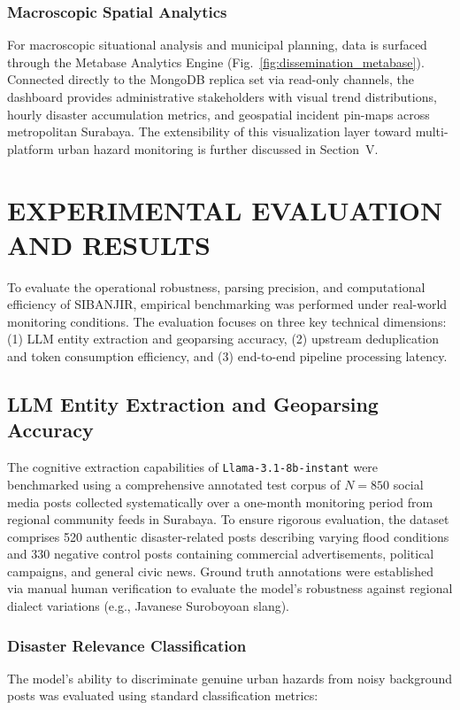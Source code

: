 \documentclass[conference]{IEEEtran}
\begin{document}
\subsubsection{Macroscopic Spatial Analytics}
For macroscopic situational analysis and municipal planning, data is surfaced through the Metabase Analytics Engine (Fig.~\ref{fig:dissemination_metabase}). Connected directly to the MongoDB replica set via read-only channels, the dashboard provides administrative stakeholders with visual trend distributions, hourly disaster accumulation metrics, and geospatial incident pin-maps across metropolitan Surabaya. The extensibility of this visualization layer toward multi-platform urban hazard monitoring is further discussed in Section~V.

\section{EXPERIMENTAL EVALUATION AND RESULTS}

To evaluate the operational robustness, parsing precision, and computational efficiency of SIBANJIR, empirical benchmarking was performed under real-world monitoring conditions. The evaluation focuses on three key technical dimensions: (1) LLM entity extraction and geoparsing accuracy, (2) upstream deduplication and token consumption efficiency, and (3) end-to-end pipeline processing latency.

\subsection{LLM Entity Extraction and Geoparsing Accuracy}
The cognitive extraction capabilities of \texttt{Llama-3.1-8b-instant} were benchmarked using a comprehensive annotated test corpus of $N = 850$ social media posts collected systematically over a one-month monitoring period from regional community feeds in Surabaya. To ensure rigorous evaluation, the dataset comprises 520 authentic disaster-related posts describing varying flood conditions and 330 negative control posts containing commercial advertisements, political campaigns, and general civic news. Ground truth annotations were established via manual human verification to evaluate the model's robustness against regional dialect variations (e.g., Javanese Suroboyoan slang).

\subsubsection{Disaster Relevance Classification}
The model's ability to discriminate genuine urban hazards from noisy background posts was evaluated using standard classification metrics:
\end{document}
